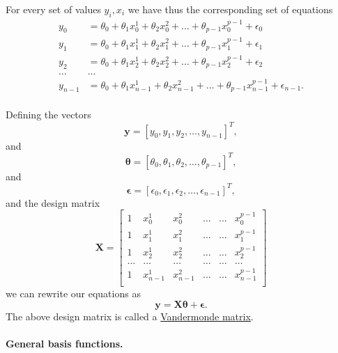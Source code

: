 \documentclass[%
oneside,                 %
final,                   %
10pt]{article}
\newenvironment{block_mdfboxadmon}[1][]{
\begin{block_mdfboxmdframed}[frametitle=#1]
}
{
\end{block_mdfboxmdframed}
}
\begin{document}

\begin{block_mdfboxadmon}[]
For every set of values $y_i,x_i$ we have thus the corresponding set of equations
\begin{align*}
y_0&=\theta_0+\theta_1x_0^1+\theta_2x_0^2+\dots+\theta_{p-1}x_0^{p-1}+\epsilon_0\\
y_1&=\theta_0+\theta_1x_1^1+\theta_2x_1^2+\dots+\theta_{p-1}x_1^{p-1}+\epsilon_1\\
y_2&=\theta_0+\theta_1x_2^1+\theta_2x_2^2+\dots+\theta_{p-1}x_2^{p-1}+\epsilon_2\\
\dots & \dots \\
y_{n-1}&=\theta_0+\theta_1x_{n-1}^1+\theta_2x_{n-1}^2+\dots+\theta_{p-1}x_{n-1}^{p-1}+\epsilon_{n-1}.\\
\end{align*}
\end{block_mdfboxadmon} %





\begin{block_mdfboxadmon}[]
Defining the vectors
\[
\bm{y} = [y_0,y_1, y_2,\dots, y_{n-1}]^T,
\]
and
\[
\bm{\theta} = [\theta_0,\theta_1, \theta_2,\dots, \theta_{p-1}]^T,
\]
and
\[
\bm{\epsilon} = [\epsilon_0,\epsilon_1, \epsilon_2,\dots, \epsilon_{n-1}]^T,
\]
and the design matrix
\[
\bm{X}=
\begin{bmatrix} 
1& x_{0}^1 &x_{0}^2& \dots & \dots &x_{0}^{p-1}\\
1& x_{1}^1 &x_{1}^2& \dots & \dots &x_{1}^{p-1}\\
1& x_{2}^1 &x_{2}^2& \dots & \dots &x_{2}^{p-1}\\                      
\dots& \dots &\dots& \dots & \dots &\dots\\
1& x_{n-1}^1 &x_{n-1}^2& \dots & \dots &x_{n-1}^{p-1}\\
\end{bmatrix} 
\]
we can rewrite our equations as
\[
\bm{y} = \bm{X}\bm{\theta}+\bm{\epsilon}.
\]
The above design matrix is called a \href{{https://en.wikipedia.org/wiki/Vandermonde_matrix}}{Vandermonde matrix}.
\end{block_mdfboxadmon} %




\paragraph{General basis functions.}
\end{document}
